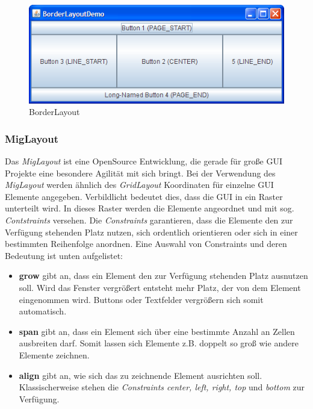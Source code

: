 \documentclass[a4paper, 11pt]{article} %
\begin{document}
\begin{figure}[!htp]
\includegraphics[width=\textwidth]{img/BorderLayoutDemo}
\caption{BorderLayout}
\label{fig:borderlayout}
\end{figure}

\subsubsection{MigLayout}
Das \emph{MigLayout} ist eine OpenSource Entwicklung, die gerade für große GUI Projekte eine besondere Agilität mit sich bringt. Bei der Verwendung des \emph{MigLayout} werden ähnlich des \emph{GridLayout} Koordinaten für einzelne GUI Elemente angegeben. Verbildlicht bedeutet dies, dass die GUI in ein Raster unterteilt wird. In dieses Raster werden die Elemente angeordnet und mit sog. \emph{Contstraints} versehen. Die \emph{Constraints} garantieren, dass die Elemente den zur Verfügung stehenden Platz nutzen, sich ordentlich orientieren oder sich in einer bestimmten Reihenfolge anordnen. Eine Auswahl von Constraints und deren Bedeutung ist unten aufgelistet:

\begin{itemize}
\item \textbf{grow} gibt an, dass ein Element den zur Verfügung stehenden Platz ausnutzen soll. Wird das Fenster vergrößert entsteht mehr Platz, der von dem Element eingenommen wird. Buttons oder Textfelder vergrößern sich somit automatisch.
\item \textbf{span} gibt an, dass ein Element sich über eine bestimmte Anzahl an Zellen ausbreiten darf. Somit lassen sich Elemente z.B. doppelt so groß wie andere Elemente zeichnen.
\item \textbf{align} gibt an, wie sich das zu zeichnende Element ausrichten soll. Klassischerweise stehen die \emph{Constraints center, left, right, top} und \emph{bottom} zur Verfügung. 
\end{itemize}
\end{document}
